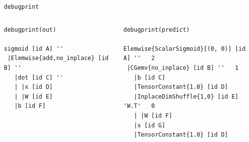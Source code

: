 \documentclass[a4paper,9pt]{beamer}
\begin{document}
\begin{frame}[fragile]{\texttt{debugprint}}
  \begin{columns}
    \begin{column}{0.45\textwidth}
    \footnotesize
      \begin{verbatim}
debugprint(out)

sigmoid [id A] ''   
 |Elemwise{add,no_inplace} [id B] ''   
   |dot [id C] ''   
   | |x [id D]
   | |W [id E]
   |b [id F]
      \end{verbatim}
    \end{column}

    \begin{column}{0.50\textwidth}
    \footnotesize
      \begin{verbatim}
debugprint(predict)

Elemwise{ScalarSigmoid}[(0, 0)] [id A] ''   2
 |CGemv{no_inplace} [id B] ''   1
   |b [id C]
   |TensorConstant{1.0} [id D]
   |InplaceDimShuffle{1,0} [id E] 'W.T'   0
   | |W [id F]
   |x [id G]
   |TensorConstant{1.0} [id D]
      \end{verbatim}
    \end{column}
  \end{columns}
\end{frame}
\end{document}
